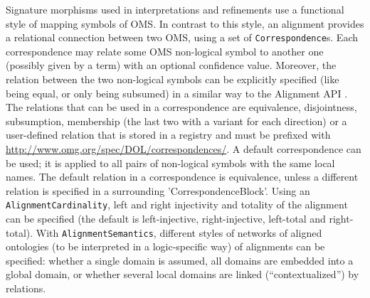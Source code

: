 \documentclass[10pt,fleqn,final]{scrreprt}
\newcommand*{\termref}[1]{\index{#1}#1\xspace}
\newcommand*{\syntax}[1]{\texttt{#1}}
\newenvironment{definitions}[0]{\medskip }{}
\begin{document}
\begin{definitions}
Signature morphisms used in interpretations and refinements use
a functional style of mapping symbols of OMS.
In contrast to this style, an alignment provides a relational 
connection between two OMS,  using a set of \syntax{Correspondence}s. Each correspondence may relate 
some OMS non-logical symbol to another one (possibly given by a term) with an optional confidence 
value. Moreover, the relation between the two non-logical symbols can be explicitly
specified (like being equal, or only being subsumed) in a similar way to the Alignment API \cite{AlignmentAPI}. 
The relations that can be used in a correspondence are equivalence, disjointness, subsumption, membership (the last two with a
variant for each direction) or a user-defined relation that is stored in a registry and must be prefixed with
\url{http://www.omg.org/spec/DOL/correspondences/}.
A default correspondence can be used; it is applied to all pairs of non-logical symbols with 
the same local names. The default relation in a correspondence is equivalence, unless  a different 
relation is specified in a surrounding 
'CorrespondenceBlock'.
Using an \syntax{AlignmentCardinality}, left and right injectivity and totality of the
\termref{alignment} can be specified (the default is left-injective, right-injective, left-total  and right-total).
With \syntax{AlignmentSemantics}, different styles of networks of aligned ontologies (to be interpreted in 
a logic-specific way) of alignments can be specified: whether a single domain is assumed, all domains are embedded into a global domain,
or whether several local domains are linked (``contextualized'') by relations.


\end{definitions}
\end{document}
